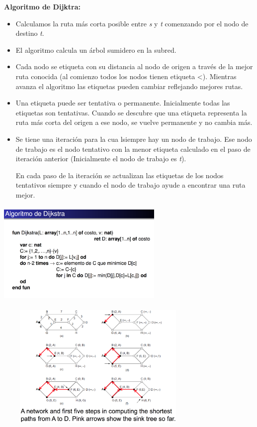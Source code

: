 \documentclass[10pt,a4paper]{report}
\begin{document}
	\par \textbf{Algoritmo de Dijktra:}
		\begin{itemize}
			\item Calculamos la ruta más corta posible entre \emph{s} y \emph{t}
			comenzando por el nodo de destino \emph{t}.
			\item El algoritmo calcula un árbol sumidero en la subred.
			\item Cada nodo se etiqueta con su distancia al nodo de origen a través de la 	
			mejor ruta conocida (al comienzo todos los nodos tienen etiqueta <). Mientras 
			avanza el algoritmo las etiquetas pueden cambiar reflejando mejores rutas.
 			\item Una etiqueta puede ser tentativa o permanente. Inicialmente todas las 
 			etiquetas son tentativas. Cuando se descubre que una etiqueta representa la 
 			ruta más corta del origen a ese nodo, se vuelve permanente y no cambia más.
			\item Se tiene una iteración para la cua lsiempre hay un nodo de trabajo. Ese 
			nodo de trabajo es el nodo tentativo con la menor etiqueta calculado en el paso 
			de iteración anterior (Inicialmente el nodo de trabajo es \emph{t}).
			
			En cada paso de la iteración se actualizan las etiquetas de los nodos tentativos 
			siempre y cuando el nodo de trabajo ayude a encontrar una ruta mejor.
		\end{itemize}

	\begin{center}
	\includegraphics[width=8cm, height=5cm]{./imagenes/dijktra.png} 

	\includegraphics[width=10cm, height=6cm]{./imagenes/caminos.png}
	\end{center}
\end{document}
